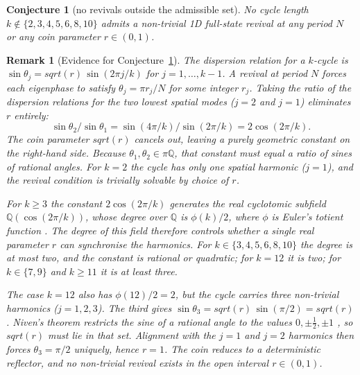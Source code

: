 \documentclass[aps,pra,reprint,amsmath,amssymb,superscriptaddress,floatfix]{revtex4-2}
\def\frac#1#2{#1/#2}%
\def\rho{r}%
\def\sqrt#1{sqrt(#1)}%
\newtheorem{remark}{Remark}
\newtheorem{conjecture}[theorem]{Conjecture}
\begin{document}
\par
\begin{conjecture}[no revivals outside the admissible set]
\label{conj:no-other-k}
No cycle length $k \notin \{2, 3, 4, 5, 6, 8, 10\}$ admits a
non-trivial 1D full-state revival at any period $N$ or any coin
parameter $\rho \in (0, 1)$.
\end{conjecture}

\begin{remark}[Evidence for Conjecture~\ref{conj:no-other-k}]
The dispersion relation for a $k$-cycle is
$\sin\theta_j = \sqrt{\rho}\,\sin(2\pi j/k)$ for
$j = 1, \ldots, k-1$. A revival at period $N$ forces each
eigenphase to satisfy $\theta_j = \pi r_j / N$ for some integer
$r_j$. Taking the ratio of the dispersion relations for the two
lowest spatial modes ($j = 2$ and $j = 1$) eliminates $\rho$
entirely:
\begin{equation}
\frac{\sin\theta_2}{\sin\theta_1}
= \frac{\sin(4\pi / k)}{\sin(2\pi / k)}
= 2\cos\!\left(\frac{2\pi}{k}\right).
\label{eq:mode-ratio}
\end{equation}
The coin parameter $\sqrt{\rho}$ cancels out, leaving a purely
geometric constant on the right-hand side. Because
$\theta_1, \theta_2 \in \pi\mathbb{Q}$, that constant must equal
a ratio of sines of rational angles. For $k = 2$ the cycle has
only one spatial harmonic ($j = 1$), and the revival condition
is trivially solvable by choice of $\rho$.

For $k \ge 3$ the constant $2\cos(2\pi/k)$ generates the real
cyclotomic subfield $\mathbb{Q}(\cos(2\pi/k))$, whose degree over
$\mathbb{Q}$ is $\phi(k)/2$, where $\phi$ is Euler's totient
function \cite{Washington1997}. The degree of this field
therefore controls whether a single real parameter $\rho$ can
synchronise the harmonics. For $k \in \{3, 4, 5, 6, 8, 10\}$ 
the degree is at most two, and
the constant is rational or quadratic; for $k = 12$ it is two; for
$k \in \{7, 9\}$ and $k \ge 11$ it is at least three.

The case $k = 12$ also has $\phi(12)/2 = 2$, but the cycle
carries three non-trivial harmonics ($j = 1, 2, 3$). The third
gives $\sin\theta_3 = \sqrt{\rho}\,\sin(\pi/2) = \sqrt{\rho}$.
Niven's theorem restricts the sine of a rational angle to the
values $0, \pm\tfrac{1}{2}, \pm 1$ \cite{Niven1956}, so
$\sqrt{\rho}$ must lie in that set. Alignment with the $j = 1$
and $j = 2$ harmonics then forces $\theta_3 = \pi/2$ uniquely,
hence $\rho = 1$. The coin reduces to a deterministic reflector,
and no non-trivial revival exists in the open interval
$\rho \in (0,1)$.


\end{remark}
\end{document}
